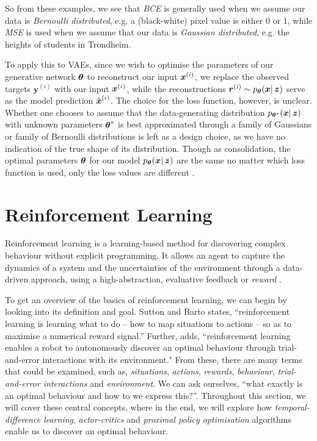 So from these examples, we see that \textit{BCE} is generally used when we assume our data is \textit{Bernoulli distributed}, e.g. a (black-white) pixel value is either 0 or 1, while \textit{MSE} is used when we assume that our data is \textit{Gaussian distributed}, e.g. the heights of students in Trondheim.

To apply this to VAEs, since we wish to optimise the parameters of our generative network $\boldsymbol{\theta}$ to reconstruct our input $\boldsymbol{x}^{(i)}$, we replace the observed targets $\boldsymbol{y}^{(i)}$ with our input $\boldsymbol{x}^{(i)}$, while the reconstructions $\boldsymbol{r}^{(i)} \sim p_{\boldsymbol{\theta}}(\boldsymbol{x} |\, \boldsymbol{z})$
serve as the model prediction $\hat{\boldsymbol{x}}^{(i)}$. The choice for the loss function, however, is unclear. Whether one chooses to assume that the data-generating distribution $p_{\boldsymbol{\theta}^*}(\boldsymbol{x}|\, \boldsymbol{z})$ with unknown parameters $\boldsymbol{\theta}^*$ is best approximated through a family of Gaussians or family of Bernoulli distributions is left as a design choice, as we have no indication of the true shape of its distribution.
Though as consolidation, the optimal parameters $\boldsymbol{\theta}$ for our model $p_{\boldsymbol{\theta}}(\boldsymbol{x} |\, \boldsymbol{z})$ are the same no matter which loss function is used, only the loss values are different \cite{DeepLearningBook}. 

\section{Reinforcement Learning}
\label{sec:2_RL}
Reinforcement learning is a learning-based method for discovering complex behaviour without explicit programming. It allows an agent to capture the dynamics of a system and the uncertainties of the environment through a data-driven approach, using a high-abstraction, evaluative feedback or \textit{reward} \cite{RLinRoboticsSurvey}.

To get an overview of the basics of reinforcement learning, we can begin by looking into its definition and goal. Sutton and Barto \cite{suttonAndBartoBook} states, “reinforcement learning is learning what to do – how to map situations to actions – so as to maximise a numerical reward signal.” Further, \cite{RLinRoboticsSurvey} adds, “reinforcement learning enables a robot to autonomously discover an optimal behaviour through trial-and-error interactions with its environment." 
From these, there are many terms that could be examined, such as, \textit{situations}, \textit{actions}, \textit{rewards}, \textit{behaviour}, \textit{trial-and-error interactions} and \textit{environment}. We can ask ourselves, “what exactly is an optimal behaviour and how to we express this?”.
Throughout this section, we will cover these central concepts, where in the end, we will explore how \textit{temporal-difference learning}, \textit{actor-critics} and \textit{proximal policy optimisation} algorithms enable us to discover an optimal behaviour.

